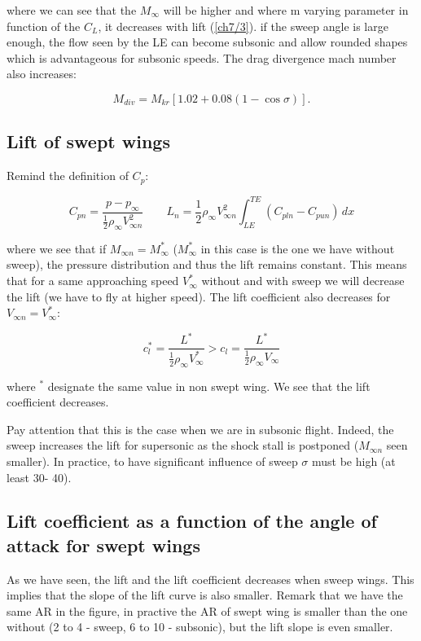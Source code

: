 	where we can see that the $M_\infty$ will be higher and where m varying parameter in function of the $C_L$, it decreases with lift (\autoref{ch7/3}). if the sweep angle is large enough, the flow seen by the LE can become subsonic and allow rounded shapes which is advantageous for subsonic speeds. The drag divergence mach number also increases:
	
	\begin{equation}
	M_{div} = M_{kr} [1.02 + 0.08 (1-\cos \sigma)].
	\end{equation}
	
\subsection{Lift of swept wings}
	Remind the definition of $C_p$: 
	
	\begin{equation}
	C_{pn} = \frac{p-p_\infty}{\frac{1}{2} \rho _\infty V_{\infty n} ^2} \qquad L_n = \frac{1}{2}\rho _\infty V_{\infty n} ^2 \int _{LE} ^{TE} (C_{pln} - C_{pun}) \, dx 
	\end{equation}
	
	where we see that if $M_{\infty n} = M_\infty^*$ ($M_\infty^*$ in this case is the one we have without sweep), the pressure distribution and thus the lift remains constant. This means that for a same approaching speed $V_\infty^*$ without and with sweep we will decrease the lift (we have to fly at higher speed). The lift coefficient also decreases for $V_{\infty n} = V_\infty^*$:
	
	\begin{equation}
	c_{l}^* = \frac{L^*}{\frac{1}{2}\rho _\infty V_{\infty}^*} > c_{l} = \frac{L^*}{\frac{1}{2}\rho _\infty V_{\infty}}
	\end{equation}
	
	where $^*$ designate the same value in non swept wing. We see that the lift coefficient decreases. 
	
	Pay attention that this is the case when we are in subsonic flight. Indeed, the sweep increases the lift for supersonic as the shock stall is postponed ($M_{\infty n}$ seen smaller). In practice, to have significant influence of sweep $\sigma$ must be high (at least 30\degres - 40\degres). 
	
\subsection{Lift coefficient as a function of the angle of attack for swept wings}	
	As we have seen, the lift and the lift coefficient decreases when sweep wings. This implies that the slope of the lift curve is also smaller. Remark that we have the same AR in the figure, in practive the AR of swept wing is smaller than the one without (2 to 4 - sweep, 6 to 10 - subsonic), but the lift slope is even smaller. 
	
